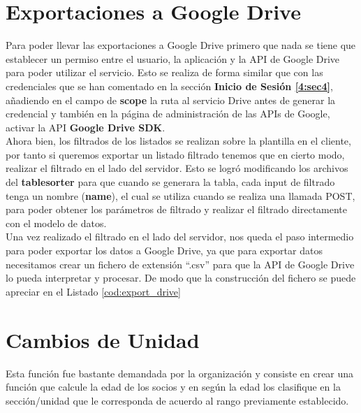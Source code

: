 \section{Exportaciones a Google Drive}
\label{4:sec9}

Para poder llevar las exportaciones a Google Drive primero que nada se tiene que establecer un permiso entre el  usuario, la aplicación y la API de Google Drive para poder utilizar el servicio. Esto se realiza de 
forma similar que con las credenciales que se han
comentado en la sección \textbf{Inicio de Sesión \ref{4:sec4}}, añadiendo en el campo de \textbf{scope} la ruta al servicio Drive antes de generar la credencial y también en la página de administración de las APIs de Google, activar la API \textbf{Google Drive SDK}.\\

Ahora bien, los filtrados de los listados se realizan sobre la plantilla en el cliente, por tanto si queremos exportar un listado filtrado tenemos que en cierto modo, realizar el filtrado en el lado del servidor.
Esto se logró modificando los archivos del \textbf{tablesorter} para que cuando se generara la tabla, cada input de filtrado tenga un nombre (\textbf{name}), el cual se utiliza cuando se realiza una llamada POST, para poder obtener los parámetros de filtrado
y realizar el filtrado directamente con el modelo de datos.\\

Una vez realizado el filtrado en el lado del servidor, nos queda el paso intermedio para poder exportar los datos a Google Drive, ya que para exportar datos necesitamos crear un fichero de extensión ``.csv'' para que la API de Google Drive lo pueda interpretar y procesar.
De modo que la construcción del fichero se puede apreciar en el Listado \ref{cod:export_drive}\\



\section{Cambios de Unidad}
\label{4:sec10}

Esta función fue bastante demandada por la organización y consiste en crear una función que calcule la edad de los socios y en según la edad los clasifique en la sección/unidad que le corresponda de acuerdo al rango previamente
establecido.\\


